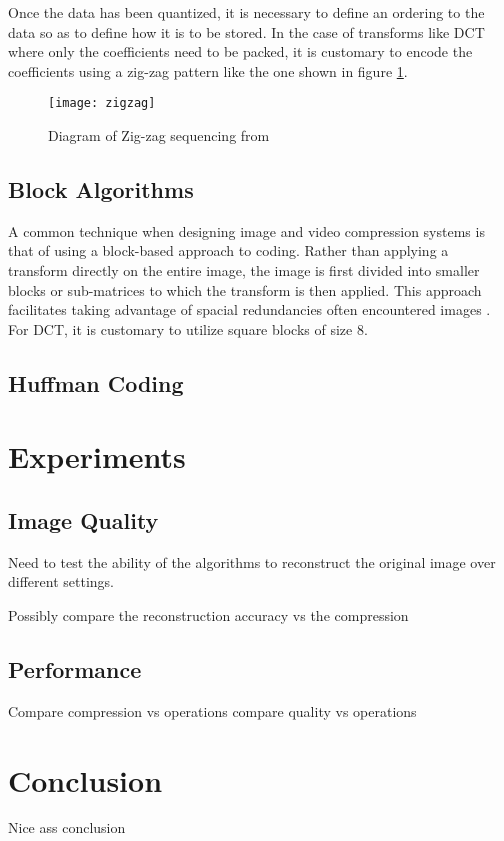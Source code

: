 \documentclass[review,onefignum,onetabnum]{siamart190516}
\begin{document}
Once the data has been quantized, it is necessary to define an ordering to the 
data so as to define how it is to be stored. In the case of transforms like DCT 
where only the coefficients need to be packed, it is customary to encode the coefficients
using a zig-zag pattern like the one shown in figure \ref{fig:zigzag}.

\begin{figure}[tbhp]
  \centering
  \texttt{[image: zigzag]}
  \caption{Diagram of Zig-zag sequencing from \cite{raid2014jpeg}}
  \label{fig:zigzag}
\end{figure}


\subsection{Block Algorithms}
A common technique when designing image and video compression systems is that of
using a block-based approach to coding. Rather than applying a transform directly
on the entire image, the image is first divided into smaller blocks or sub-matrices
to which the transform is then applied. This approach facilitates taking advantage of
spacial redundancies often encountered images \cite{ahmed1974discrete}. For DCT, 
it is customary to utilize square blocks of size 8.

\subsection{Huffman Coding}
\lipsum[27-29]

\section{Experiments}
\subsection{Image Quality}
Need to test the ability of the algorithms to reconstruct the original image 
over different settings.

Possibly compare the reconstruction accuracy vs the compression

\lipsum[26-30]

\subsection{Performance}
Compare compression vs operations
compare quality vs operations

\lipsum[31-32]

\section{Conclusion}
Nice ass conclusion

\lipsum[33-34]

\pagebreak


\end{document}
